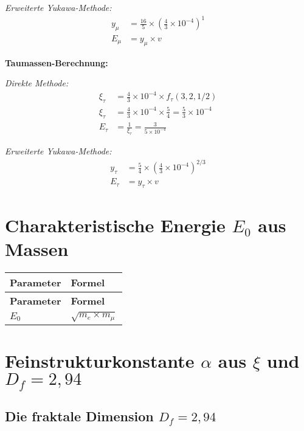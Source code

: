 \documentclass[12pt,a4paper]{article}
\begin{document}
	\textit{Erweiterte Yukawa-Methode:}
	\begin{align}
		y_\mu &= \frac{16}{5} \times \left(\frac{4}{3} \times 10^{-4}\right)^1 \\
		E_\mu &= y_\mu \times v
	\end{align}
	
	\textbf{Taumassen-Berechnung:}
	
	\textit{Direkte Methode:}
	\begin{align}
		\xi_\tau &= \frac{4}{3} \times 10^{-4} \times f_\tau(3,2,1/2) \\
		\xi_\tau &= \frac{4}{3} \times 10^{-4} \times \frac{5}{4} = \frac{5}{3} \times 10^{-4} \\
		E_{\tau} &= \frac{1}{\xi_\tau} = \frac{3}{5 \times 10^{-4}}
	\end{align}
	
	\textit{Erweiterte Yukawa-Methode:}
	\begin{align}
		y_\tau &= \frac{5}{4} \times \left(\frac{4}{3} \times 10^{-4}\right)^{2/3} \\
		E_\tau &= y_\tau \times v
	\end{align}
	
	\section{Charakteristische Energie \(E_0\) aus Massen}
	
	\begin{longtable}{|p{3cm}|p{4cm}|}
		\hline
		\textbf{Parameter} & \textbf{Formel} \\
		\hline
		\endfirsthead
		\hline
		\textbf{Parameter} & \textbf{Formel} \\
		\hline
		\endhead
		\(E_0\) & \(\sqrt{m_e \times m_{\mu}}\) \\
		\hline
	\end{longtable}
	
	\section{Feinstrukturkonstante \(\alpha\) aus \(\xi\) und \(D_f = 2{,}94\)}
	
	\subsection{Die fraktale Dimension \(D_f = 2{,}94\)}
	
\end{document}
